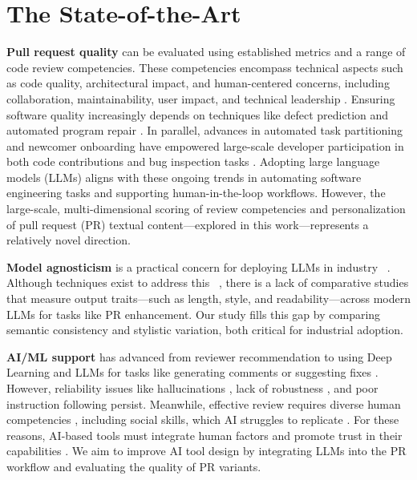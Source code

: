 \documentclass[conference]{IEEEtran}
\begin{document}

\section{The State-of-the-Art}\label{sec:sota}
\textbf{Pull request quality} can be evaluated using established metrics \cite{li2003ranking} and a range of code review competencies. These competencies encompass technical aspects such as code quality, architectural impact, and human-centered concerns, including collaboration, maintainability, user impact, and technical leadership \cite{wurzel2023competencies}. Ensuring software quality increasingly depends on techniques like defect prediction \cite{zhang2022machine} and automated program repair \cite{huang2024evolving}. In parallel, advances in automated task partitioning \cite{adriano2016exploring,latoza2014microtask} and newcomer onboarding \cite{tan2025revolutionizing,steinmacher2018let} have empowered large-scale developer participation in both code contributions \cite{aghayi2023controlled} and bug inspection tasks \cite{adriano2022microtasking}. Adopting large language models (LLMs) aligns with these ongoing trends in automating software engineering tasks and supporting human-in-the-loop workflows. However, the large-scale, multi-dimensional scoring of review competencies and personalization of pull request (PR) textual content—explored in this work—represents a relatively novel direction.

\textbf{Model agnosticism }is a practical concern for deploying LLMs in industry ~\cite{devireddy2025comparative}. Although techniques exist to address this ~\cite{wang2024natural, horne2023vader}, there is a lack of comparative studies that measure output traits—such as length, style, and readability—across modern LLMs for tasks like PR enhancement. Our study fills this gap by comparing semantic consistency and stylistic variation, both critical for industrial adoption.

\textbf{AI/ML support} has advanced from reviewer recommendation \cite{thongtanunam2015should, zanjani2016automatically} to using Deep Learning and LLMs for tasks like generating comments or suggesting fixes \cite{tufano2022using, li2022automating, froemmgen2024resolving, lu2023llama}. However, reliability issues like hallucinations \cite{tonmoy2024comprehensive}, lack of robustness \cite{li2025enhancing}, and poor instruction following \cite{wang2025codeif} persist.  Meanwhile, effective review requires diverse human competencies \cite{wurzel2023competencies}, including social skills, which AI struggles to replicate \cite{yang2024survey}. For these reasons, AI-based tools must integrate human factors and promote trust in their capabilities \cite{mehrotra2024systematic,kim2023humans}. We aim to improve AI tool design by integrating LLMs into the PR workflow and evaluating the quality of PR variants.
\end{document}
